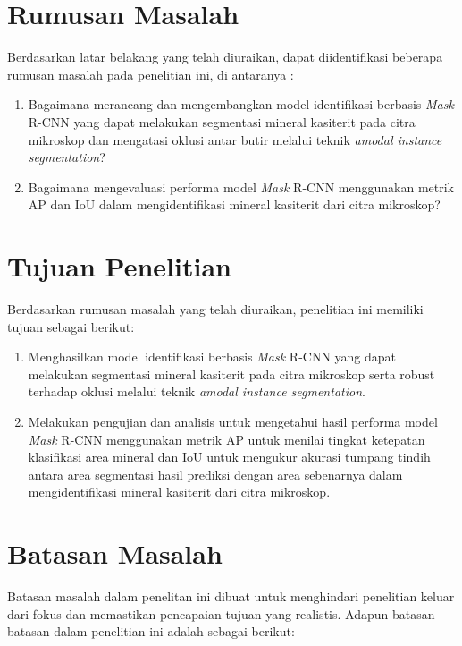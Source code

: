 \section{Rumusan Masalah} \label{I.Rumusan Masalah}
Berdasarkan latar belakang yang telah diuraikan, dapat diidentifikasi beberapa rumusan masalah pada penelitian ini, di antaranya :

\begin{enumerate}[noitemsep]
	\item Bagaimana merancang dan mengembangkan model identifikasi berbasis \textit{Mask} R-CNN yang dapat melakukan segmentasi mineral kasiterit pada citra mikroskop dan mengatasi oklusi antar butir melalui teknik \textit{amodal instance segmentation}?
	\item Bagaimana mengevaluasi performa model \textit{Mask} R-CNN menggunakan metrik AP dan IoU dalam mengidentifikasi mineral kasiterit dari citra mikroskop?
\end{enumerate}

\section{Tujuan Penelitian} \label{I.Tujuan}
Berdasarkan rumusan masalah yang telah diuraikan, penelitian ini memiliki tujuan sebagai berikut:

\begin{enumerate}[noitemsep]
	\item Menghasilkan model identifikasi berbasis \textit{Mask} R-CNN yang dapat melakukan segmentasi mineral  kasiterit pada citra mikroskop serta robust terhadap oklusi melalui teknik \textit{amodal instance segmentation}.
	\item Melakukan pengujian dan analisis untuk mengetahui hasil performa model \textit{Mask} R-CNN menggunakan metrik AP untuk menilai tingkat ketepatan klasifikasi area mineral dan IoU untuk mengukur akurasi tumpang tindih antara area segmentasi hasil prediksi dengan area sebenarnya dalam mengidentifikasi mineral kasiterit dari citra mikroskop.
\end{enumerate}

\section{Batasan Masalah} \label{I.Batasan}
Batasan masalah dalam penelitan ini dibuat untuk  menghindari penelitian keluar dari fokus dan memastikan pencapaian tujuan yang realistis. Adapun batasan-batasan dalam penelitian ini adalah sebagai berikut:

